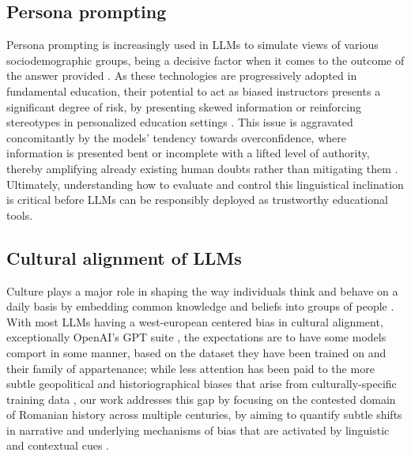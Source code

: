 \documentclass[11pt]{article}
\begin{document}
\subsection{Persona prompting}
Persona prompting is increasingly used in LLMs to simulate views of various sociodemographic groups, being a decisive factor when it comes to the outcome of the answer provided \cite{lutz2025}. As these technologies are progressively adopted in fundamental education, their potential to act as biased instructors presents a significant degree of risk, by presenting skewed information or reinforcing stereotypes in personalized education settings \cite{weissburg2025}. This issue is aggravated concomitantly by the models' tendency towards overconfidence, where information is presented bent or incomplete with a lifted level of authority, thereby amplifying already existing human doubts rather than mitigating them \cite{sun2025}. Ultimately, understanding how to evaluate and control this linguistical inclination is critical before LLMs can be responsibly deployed as trustworthy educational tools.

\subsection{Cultural alignment of LLMs}
Culture plays a major role in shaping the way individuals think and behave on a daily basis \cite{oyserman2008} by embedding common knowledge and beliefs into groups of people \cite{hofstede2001}. With most LLMs having a west-european centered bias in cultural alignment, exceptionally OpenAI's GPT suite \cite{tao2024}, the expectations are to have some models comport in some manner, based on the dataset they have been trained on and their family of appartenance; while less attention has been paid to the more subtle geopolitical and historiographical biases that arise from culturally-specific training data \cite{hauser2024}, our work addresses this gap by focusing on the contested domain of Romanian history across multiple centuries, by aiming to quantify subtle shifts in narrative and underlying mechanisms of bias that are activated by linguistic and contextual cues \cite{bhatia2024}.
\end{document}
